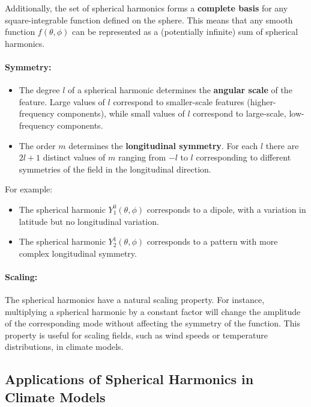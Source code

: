 Additionally, the set of spherical harmonics forms a \textbf{complete basis} for any square-integrable function defined on the sphere. This means that any smooth function $f(\theta,\phi)$ can be represented as a (potentially infinite) sum of spherical harmonics.

\paragraph{\textbf{Symmetry}:}

\begin{itemize}
	\item The degree $l$ of a spherical harmonic determines the \textbf{angular scale} of the feature. Large values of $l$ correspond to smaller-scale features (higher-frequency components), while small values of $l$ correspond to large-scale, low-frequency components.
	\item The order $m$ determines the \textbf{longitudinal symmetry}. For each $l$ there are $2l+1$ distinct values of $m$ ranging from $-l$ to $l$ corresponding to different symmetries of the field in the longitudinal direction.
\end{itemize}
For example:

\begin{itemize}
	\item The spherical harmonic $Y_1^0(\theta,\phi)$ corresponds to a dipole, with a variation in latitude but no longitudinal variation.
	\item The spherical harmonic $Y_2^1(\theta,\phi)$ corresponds to a pattern with more complex longitudinal symmetry.
\end{itemize}

\paragraph{\textbf{Scaling}:}

The spherical harmonics have a natural scaling property. For instance, multiplying a spherical harmonic by a constant factor will change the amplitude of the corresponding mode without affecting the symmetry of the function. This property is useful for scaling fields, such as wind speeds or temperature distributions, in climate models.

\subsection{Applications of Spherical Harmonics in Climate Models}

